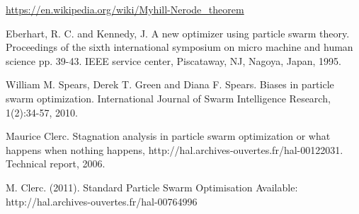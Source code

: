 \documentclass[runningheads,a4paper]{llncs}
\begin{document}
\begin{thebibliography}{9}
\url{https://en.wikipedia.org/wiki/Myhill-Nerode_theorem}

Eberhart, R. C. and Kennedy, J. A new optimizer using particle swarm theory. Proceedings of the sixth international symposium on micro machine and human science pp. 39-43. IEEE service center, Piscataway, NJ, Nagoya, Japan, 1995.

William M. Spears, Derek T. Green and Diana F. Spears. Biases in particle swarm optimization. International Journal of Swarm Intelligence Research, 1(2):34-57, 2010.

Maurice Clerc. Stagnation analysis in particle swarm optimization or what happens when nothing happens, http://hal.archives-ouvertes.fr/hal-00122031. Technical report, 2006.

M. Clerc. (2011). Standard Particle Swarm Optimisation Available: http://hal.archives-ouvertes.fr/hal-00764996 

\end{thebibliography}
\end{document}

